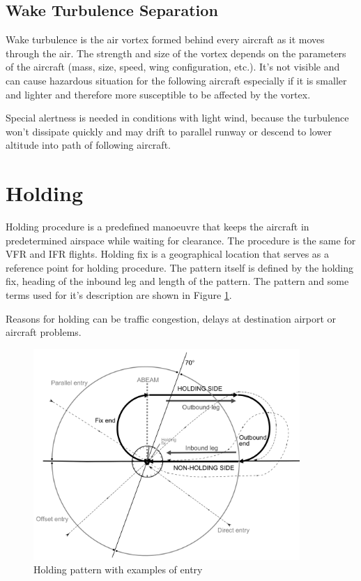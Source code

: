 \subsection{Wake Turbulence Separation}

Wake turbulence is the air vortex formed behind every aircraft as it moves through the air. The strength and size of the vortex depends on the parameters of the aircraft (mass, size, speed, wing configuration, etc.). It's not visible and can cause hazardous situation for the following aircraft especially if it is smaller and lighter and therefore more susceptible to be affected by the vortex.

Special alertness is needed in conditions with light wind, because the turbulence won't dissipate quickly and may drift to parallel runway or descend to lower altitude into path of following aircraft.


\section{Holding}

Holding procedure is a predefined manoeuvre that keeps the aircraft in predetermined airspace while waiting for clearance. The procedure is the same for VFR and IFR flights. Holding fix is a geographical location that serves as a reference point for holding procedure. The pattern itself is defined by the holding fix, heading of the inbound leg and length of the pattern. \cite[Chapter 6]{doc4444} The pattern and some terms used for it's description are shown in Figure \ref{fig:holding}.

Reasons for holding can be traffic congestion, delays at destination airport or aircraft problems.


\begin{figure}[h]
    \centering
    \includegraphics[width=0.9\textwidth]{figures/holding.png}
    \caption{Holding pattern with examples of entry}
    \label{fig:holding}
\end{figure}

